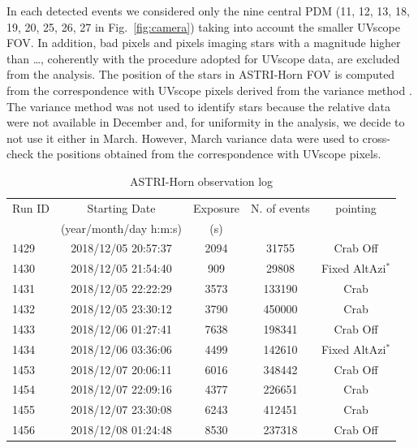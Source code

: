 In each detected events we considered only the nine central PDM (11, 12, 13, 18, 19, 20, 25, 26, 27 in Fig.~\ref{fig:camera}) taking into account the smaller UVscope FOV.  In addition, bad pixels and pixels imaging stars with a magnitude higher than …, coherently with the procedure adopted for UVscope data, are excluded from the analysis. The position of the stars in ASTRI-Horn FOV is computed from the correspondence with UVscope pixels derived from the variance method \citep{Segreto2019}. 
The variance method was not used to identify stars because the relative data were not available in December and, for uniformity in the analysis, we decide to not use it either in March.  However, March variance data were used to cross-check the positions obtained from the correspondence with UVscope pixels.

\begin{table}[ht]
\caption{ASTRI-Horn observation log}
\centering
\begin{tabular}{lcccc}
\hline\hline
Run ID & Starting Date & Exposure      & N. of events & pointing \\
               & (year/month/day h:m:s) & (s)  \\
\hline     
1429 & 2018/12/05 20:57:37  &   2094     & 31755 & Crab Off    \\
1430 & 2018/12/05 21:54:40  &   909      & 29808 & Fixed AltAzi$^*$    \\
1431 & 2018/12/05 22:22:29  &   3573     & 133190 & Crab     \\ %
1432 & 2018/12/05 23:30:12  &   3790     & 450000 & Crab     \\ %
1433 & 2018/12/06 01:27:41  &   7638     & 198341 & Crab Off    \\ %
1434 & 2018/12/06 03:36:06  &   4499     & 142610 &  Fixed AltAzi$^*$  \\ %
1453 & 2018/12/07 20:06:11  &   6016     & 348442 & Crab Off    \\
1454 & 2018/12/07 22:09:16  &   4377     & 226651 &  Crab \\ %
1455 & 2018/12/07 23:30:08  &   6243     & 412451 &  Crab \\ %
1456 & 2018/12/08 01:24:48  &  8530     & 237318 & Crab Off \\ %

\end{tabular}
\end{table}
